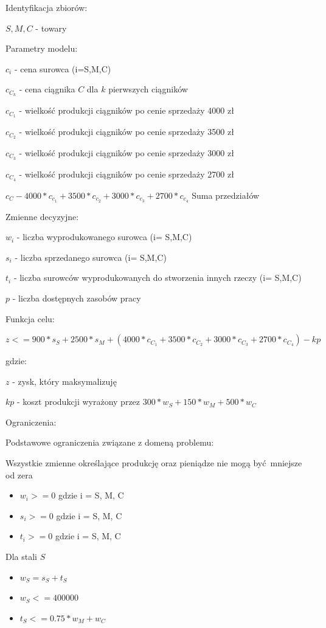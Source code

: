 \documentclass{article}
\begin{document}
\noindent
Identyfikacja zbiorów: 

${ S, M ,C }$ - towary

\noindent
Parametry modelu:

$c_i$ - cena surowca (i=S,M,C)

$c_C_k$ - cena ciągnika $C$ dla $k$ pierwszych ciągników

$c_C_1$ - wielkość produkcji ciągników po cenie sprzedaży 4000 zł

$c_C_2$ - wielkość produkcji ciągników po cenie sprzedaży 3500 zł

$c_C_3$ - wielkość produkcji ciągników po cenie sprzedaży 3000 zł

$c_C_4$ - wielkość produkcji ciągników po cenie sprzedaży 2700 zł

$c_C - 4000 * c_c_1 + 3500 * c_c_2 + 3000 * c_c_3 + 2700 * c_c_4$ Suma przedziałów

\noindent
Zmienne decyzyjne:

$w_i$ - liczba wyprodukowanego surowca (i= S,M,C)

$s_i$ - liczba sprzedanego surowca (i= S,M,C)

$t_i$ - liczba surowców wyprodukowanych do stworzenia innych rzeczy (i= S,M,C)

$p$ - liczba dostępnych zasobów pracy

\noindent
Funkcja celu:

$z <= 900 * s_S + 2500 * s_M + (4000 * c_C_1 + 3500 * c_C_2 + 3000 * c_C_3 + 2700 * c_C_4) - kp$

gdzie:

$z$ - zysk, który maksymalizuję

$kp$ - koszt produkcji wyrażony przez $300 * w_S + 150 * w_M + 500 * w_C$

\noindent
Ograniczenia:

Podstawowe ograniczenia związane z domeną problemu:

Wszystkie zmienne określające produkcję oraz pieniądze nie mogą być mniejsze od zera

\begin{itemize}
  \item $w_i >= 0$ gdzie i = S, M, C
  \item $s_i >= 0$ gdzie i = S, M, C
  \item $t_i >= 0$ gdzie i = S, M, C
\end{itemize}

Dla stali $S$

\begin{itemize}
  \item $w_S = s_S + t_S$
  \item $w_S <= 400000$
  \item $t_S <= 0.75 * w_M + w_C$
\end{itemize}
\end{document}
